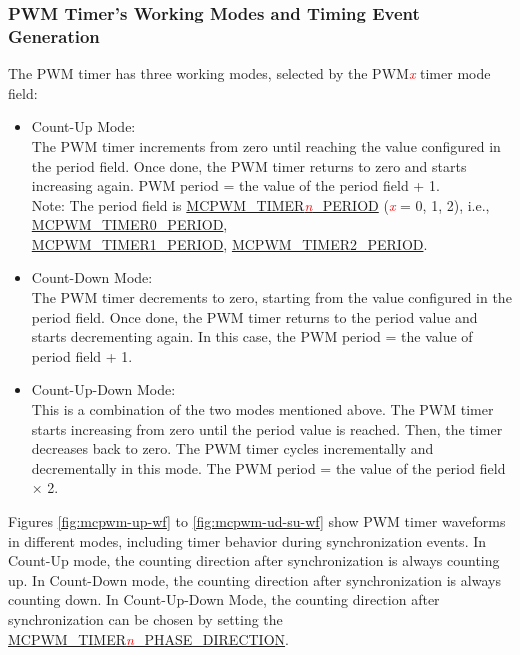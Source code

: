 \documentclass[main\_\_EN.tex]{subfiles}
\begin{document}
\subsubsection{PWM Timer's Working Modes and Timing Event Generation}
\label{sec:mcpwm-modes-and-event-generation}

The PWM timer has three working modes, selected by the PWM\textcolor{red}{\it{x}} timer mode field:
\begin{itemize}
    \item Count-Up Mode: \\
    The PWM timer increments from zero until reaching the value configured in the period field. Once done, the PWM timer returns to zero and starts increasing again. PWM period = the value of the period field + 1.\\
    Note: The period field is \hyperref[fielddesc:MCPWMTIMERNPERIOD]{MCPWM\_TIMER\textcolor{red}{\it{n}}\_PERIOD} (\textcolor{red}{\it{x}} = 0, 1, 2), i.e., \hyperref[fielddesc:MCPWMTIMERNPERIOD]{MCPWM\_TIMER0\_PERIOD},\\ \hyperref[fielddesc:MCPWMTIMERNPERIOD]{MCPWM\_TIMER1\_PERIOD}, \hyperref[fielddesc:MCPWMTIMERNPERIOD]{MCPWM\_TIMER2\_PERIOD}.
    \item Count-Down Mode: \\
    The PWM timer decrements to zero, starting from the value configured in the period field. Once done, the PWM timer returns to the period value and starts decrementing again. In this case, the PWM period = the value of period field + 1.
    \item Count-Up-Down Mode: \\
    This is a combination of the two modes mentioned above. The PWM timer starts increasing from zero until the period value is reached. Then, the timer decreases back to zero. The PWM timer cycles incrementally and decrementally in this mode. The PWM period = the value of the period field × 2.
\end{itemize}

Figures \ref{fig:mcpwm-up-wf} to \ref{fig:mcpwm-ud-su-wf} show PWM timer waveforms in different modes, including timer behavior during synchronization events. In Count-Up mode, the counting direction after synchronization is always counting up. In Count-Down mode, the counting direction after synchronization is always counting down. In Count-Up-Down Mode, the counting direction after synchronization can be chosen by setting the \hyperref[fielddesc:MCPWMTIMERNPHASEDIRECTION]{MCPWM\_TIMER\textcolor{red}{\it{n}}\_PHASE\_DIRECTION}.
\end{document}
